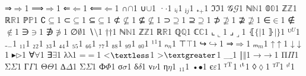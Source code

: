 {{{⇒}{{\ensuremath{\Rightarrow}}}1
{⟹}{{\ensuremath{\Longrightarrow}}}1
{⇐}{{\ensuremath{\Leftarrow}}}1
{⟸}{{\ensuremath{\Longleftarrow}}}1
{∩}{{\ensuremath{\cap}}}1
{∪}{{\ensuremath{\cup}}}1
{·}{{\ensuremath{\cdot}}}1
{ᵢ}{{\ensuremath{_i}}}1
{ⱼ}{{\ensuremath{_j}}}1
{₊}{{\ensuremath{_+}}}1
{ℑ}{{\ensuremath{\Im}}}1
{𝒢}{{\ensuremath{\mathcal{G}}}}1
{ℕ}{{\ensuremath{\mathbb{N}}}}1
{𝟘}{{\ensuremath{\mathbb{0}}}}1
{ℤ}{{\ensuremath{\mathbb{Z}}}}1
{ℝ}{{\ensuremath{\mathbb{R}}}}1
{ℙ}{{\ensuremath{\mathbb{P}}}}1
{∁}{{\ensuremath{\subseteq}}}1
{⊂}{{\ensuremath{\subseteq}}}1
{⊆}{{\ensuremath{\subseteq}}}1
{⊄}{{\ensuremath{\nsubseteq}}}1
{⊈}{{\ensuremath{\nsubseteq}}}1
{⊃}{{\ensuremath{\supseteq}}}1
{⊇}{{\ensuremath{\supseteq}}}1
{⊅}{{\ensuremath{\nsupseteq}}}1
{⊉}{{\ensuremath{\nsupseteq}}}1
{∈}{{\ensuremath{\in}}}1
{∉}{{\ensuremath{\notin}}}1
{∋}{{\ensuremath{\ni}}}1
{∌}{{\ensuremath{\notni}}}1
{∅}{{\ensuremath{\emptyset}}}1
{∖}{{\ensuremath{\setminus}}}1
{†}{{\ensuremath{\dag}}}1
{ℕ}{{\ensuremath{\mathbb{N}}}}1
{ℤ}{{\ensuremath{\mathbb{Z}}}}1
{ℝ}{{\ensuremath{\mathbb{R}}}}1
{ℚ}{{\ensuremath{\mathbb{Q}}}}1
{ℂ}{{\ensuremath{\mathbb{C}}}}1
{⌞}{{\ensuremath{\llcorner}}}1
{⌟}{{\ensuremath{\lrcorner}}}1
{⦃}{{\ensuremath{ \{\!| }}}1
{⦄}{{\ensuremath{ |\!\} }}}1
{ᵁ}{{\ensuremath{^U}}}1
{₋}{{\ensuremath{_{-}}}}1
{₁}{{\ensuremath{_1}}}1
{₂}{{\ensuremath{_2}}}1
{₃}{{\ensuremath{_3}}}1
{₄}{{\ensuremath{_4}}}1
{₅}{{\ensuremath{_5}}}1
{₆}{{\ensuremath{_6}}}1
{₇}{{\ensuremath{_7}}}1
{₈}{{\ensuremath{_8}}}1
{₉}{{\ensuremath{_9}}}1
{₀}{{\ensuremath{_0}}}1
{¹}{{\ensuremath{^1}}}1
{ₙ}{{\ensuremath{_n}}}1
{⊤}{{\ensuremath{\top}}}1
{↪}{{\ensuremath{\hookrightarrow}}}1
{⇒}{{\ensuremath{\Rightarrow}}}1
{ₘ}{{\ensuremath{_m}}}1
{↑}{{\ensuremath{\uparrow}}}1
{↓}{{\ensuremath{\downarrow}}}1
{▸}{{\ensuremath{\triangleright}}}1
{∀}{{\ensuremath{\forall}}}1
{∃}{{\ensuremath{\exists}}}1
{λ}{{\ensuremath{\mathrm{\lambda}}}}1
{=}{{\ensuremath{=}}}1
{<}{{\ensuremath{\textless}}}1
{>}{{\ensuremath{\textgreater}}}1
{_}{{$\_$}}1
{‖}{{\ensuremath{\Vert}}}1
{→}{{$\rightarrow$}}1
{Π}{{$\Pi$}}1
{Σ}{{$\Sigma$}}1
{Г}{{$\Gamma$}}1
{Θ}{{$\Theta$}}1
{∆}{{$\Delta$}}1
{Σ}{{$\Sigma$}}1
{Ф}{{$\Phi$}}1
{σ}{{$\sigma$}}1
{δ}{{$\delta$}}1
{ν}{{$\nu$}}1
{η}{{$\eta$}}1
{₁}{{$_1$}}1
{•}{{$\bullet$}}1
{є}{{$\varepsilon$}}1
{ᵀ}{{$\textsuperscript{T}$}}1
{ᵗ}{{$\textsuperscript{t}$}}1
{◊}{{$\lozenge$}}1
{ᵀ}{{$^T$}}1
{ᵗ}{{$^t$}}1
 }
}

\theoremstyle{definition}

\newtheorem{definition}{Definition}
\newtheorem{theorem}{Theorem}
\newtheorem{lemma}{Lemma}
\newtheorem{notation}{Notation}
\newtheorem{acknowledgment}{Acknowledgment}
\newtheorem{example}{Example}
\newtheorem{remark}{Remark}
\newtheorem{corollary}{Corollary}
\newtheorem{proposition}{Proposition}


